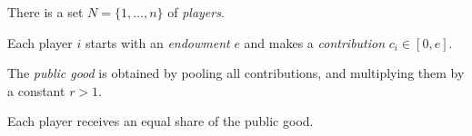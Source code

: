 \documentclass[
    preview, 
    varwidth = 8cm, 
    border = {2pt 0pt 0pt 0pt}
    ]{standalone} %
\begin{document}
\raggedright
    There is a set \(N = \{1, \dots, n\}\) of \emph{players}.
    
    \vspace{1em}
    Each player \(i\) starts with an \emph{endowment} \(e\)
    and makes a \emph{contribution} \(c_i \in [0, e]\).

    \vspace{1em}
    The \emph{public good} is obtained by pooling all contributions,
    and multiplying them by a constant \(r > 1\).

    \vspace{1em}    Each player receives an equal share of the public good.
\end{document}
